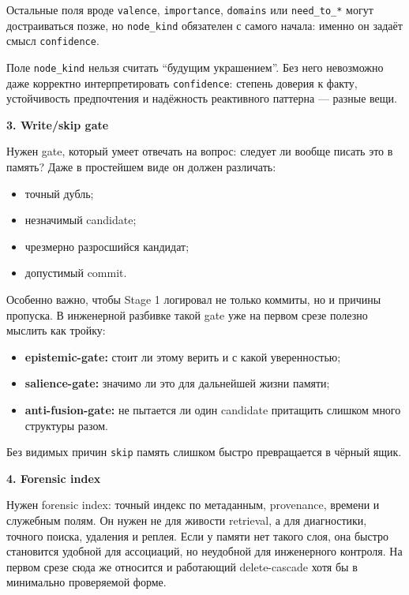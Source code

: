 Остальные поля вроде \texttt{valence}, \texttt{importance}, \texttt{domains}
или \texttt{need\_to\_*} могут достраиваться позже, но \texttt{node\_kind}
обязателен с самого начала: именно он задаёт смысл \texttt{confidence}.

\begin{intuition}
Поле \texttt{node\_kind} нельзя считать ``будущим украшением''. Без него
невозможно даже корректно интерпретировать \texttt{confidence}: степень
доверия к факту, устойчивость предпочтения и надёжность реактивного паттерна
--- разные вещи.
\end{intuition}

\textbf{3. Write/skip gate}

Нужен gate, который умеет отвечать на вопрос: следует ли вообще писать это в
память? Даже в простейшем виде он должен различать:

\begin{itemize}\itemsep2pt
\item точный дубль;
\item незначимый candidate;
\item чрезмерно разросшийся кандидат;
\item допустимый commit.
\end{itemize}

Особенно важно, чтобы Stage 1 логировал не только коммиты, но и причины
пропуска. В инженерной разбивке такой gate уже на первом срезе полезно
мыслить как тройку:

\begin{itemize}\itemsep2pt
\item \textbf{epistemic-gate:} стоит ли этому верить и с какой уверенностью;
\item \textbf{salience-gate:} значимо ли это для дальнейшей жизни памяти;
\item \textbf{anti-fusion-gate:} не пытается ли один candidate притащить
слишком много структуры разом.
\end{itemize}

Без видимых причин \texttt{skip} память слишком быстро превращается в чёрный
ящик.

\textbf{4. Forensic index}

Нужен forensic index: точный индекс по метаданным, provenance, времени и
служебным полям. Он нужен не для живости retrieval, а для диагностики,
точного поиска, удаления и реплея. Если у памяти нет такого слоя, она быстро
становится удобной для ассоциаций, но неудобной для инженерного контроля. На
первом срезе сюда же относится и работающий delete-cascade хотя бы в
минимально проверяемой форме.

